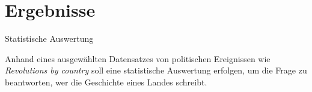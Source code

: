 \chapter{Ergebnisse}\label{ch:results}

\begin{todos}
    \item Statistische Auswertung
\end{todos}

Anhand eines ausgewählten Datensatzes von politischen Ereignissen wie \emph{Revolutions by country} soll eine statistische Auswertung erfolgen, um die Frage zu beantworten, wer die Geschichte eines Landes schreibt.

